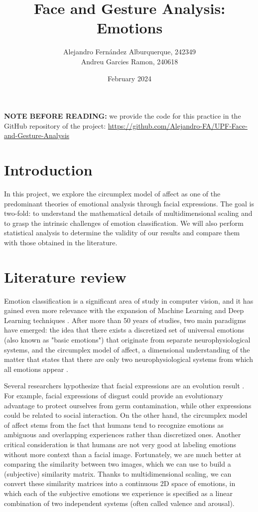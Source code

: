 \documentclass[11pt, a4paper]{article}
\numberwithin{equation}{subsection}
\begin{document}
\title{Face and Gesture Analysis: Emotions}
\author{Alejandro Fernández Alburquerque, 242349 \\ Andreu Garcies Ramon, 240618}
\date{February 2024}

\maketitle

\textbf{NOTE BEFORE READING:} we provide the code for this practice in the GitHub repository of the project: \url{https://github.com/Alejandro-FA/UPF-Face-and-Gesture-Analysis}

\section{Introduction}

In this project, we explore the circumplex model of affect as one of the predominant theories of emotional analysis through facial expressions. The goal is two-fold: to understand the mathematical details of multidimensional scaling and to grasp the intrinsic challenges of emotion classification. We will also perform statistical analysis to determine the validity of our results and compare them with those obtained in the literature.

\section{Literature review}

Emotion classification is a significant area of study in computer vision, and it has gained even more relevance with the expansion of Machine Learning and Deep Learning techniques \cite{pantic-2009}. After more than 50 years of studies, two main paradigms have emerged: the idea that there exists a discretized set of universal emotions (also known as "basic emotions") that originate from separate neurophysiological systems, and the circumplex model of affect, a dimensional understanding of the matter that states that there are only two neurophysiological systems from which all emotions appear \cite{posner-2005}.

Several researchers hypothesize that facial expressions are an evolution result \cite{du-2015}. For example, facial expressions of disgust could provide an evolutionary advantage to protect ourselves from germ contamination, while other expressions could be related to social interaction. On the other hand, the circumplex model of affect stems from the fact that humans tend to recognize emotions as ambiguous and overlapping experiences rather than discretized ones. Another critical consideration is that humans are not very good at labeling emotions without more context than a facial image. Fortunately, we are much better at comparing the similarity between two images, which we can use to build a (subjective) similarity matrix. Thanks to multidimensional scaling, we can convert these similarity matrices into a continuous 2D space of emotions, in which each of the subjective emotions we experience is specified as a linear combination of two independent systems (often called valence and arousal).
\end{document}
